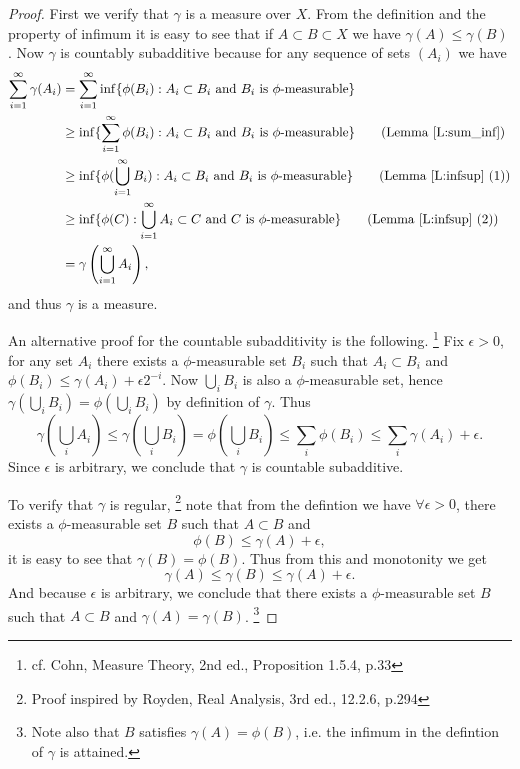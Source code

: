 \begin{proof}
First we verify that $\gamma$ is a measure over $X$. From the definition and the 
property of infimum it is easy to see that if $A\subset B\subset X$ we have
$\gamma(A)\le\gamma(B)$. Now $\gamma$ is countably subadditive because
for any sequence of sets $(A_i)$ we have
\begin{align*}
  \sum_{i=1}^{\infty} \gamma(A_i)
    &= \sum_{i=1}^{\infty} 
      \inf\{\phi(B_i): \text{$A_i\subset B_i$ and $B_i$ is $\phi$-measurable} \}
      \notag \\
    &\ge \inf \{ 
         \sum_{i=1}^{\infty} 
         \phi(B_i): \text{$A_i\subset B_i$ and $B_i$ is $\phi$-measurable} \}
       \qquad \text{(Lemma \ref{L:sum_inf})}    \notag \\
    &\ge \inf \{ 
         \phi(\bigcup_{i=1}^{\infty} B_i): 
             \text{$A_i\subset B_i$ and $B_i$ is $\phi$-measurable} \}
       \qquad \text{(Lemma \ref{L:infsup} (1))}    \notag \\
    &\ge 
      \inf \{ \phi(C):
      \text{$\bigcup_{i=1}^{\infty} A_i\subset C$ and $C$ is $\phi$-measurable} 
      \}       \qquad \text{(Lemma \ref{L:infsup} (2))}    \notag \\
    &= \gamma\left( \bigcup_{i=1}^{\infty} A_i \right),  \notag
\end{align*}
and thus $\gamma$ is a measure.

An alternative proof for the countable subadditivity is the following.
\footnote{cf. Cohn, Measure Theory, 2nd ed., Proposition 1.5.4, p.33}
Fix $\epsilon>0$, for any set $A_i$ there exists a $\phi$-measurable set $B_i$ 
such that $A_i\subset B_i$ and $\phi(B_i)\le \gamma(A_i)+\epsilon 2^{-i}$. 
Now $\bigcup_i B_i$ is also a $\phi$-measurable set, hence 
$\gamma(\bigcup_i B_i)=\phi(\bigcup_i B_i)$ by definition of $\gamma$. Thus
\[
  \gamma(\bigcup_i A_i) \le \gamma(\bigcup_i B_i) 
    = \phi(\bigcup_i B_i) \le \sum_i \phi(B_i) 
    \le \sum_i \gamma(A_i) + \epsilon.
\]
Since $\epsilon$ is arbitrary, we conclude that $\gamma$ is countable
subadditive. 

To verify that $\gamma$ is regular, 
\footnote{Proof inspired by Royden, Real Analysis, 3rd ed., 12.2.6, p.294}
note that from the defintion we have 
$\forall\epsilon>0$, there exists a $\phi$-measurable set $B$ such that
$A\subset B$ and 
\[
  \phi(B)\le \gamma(A)+\epsilon,
\]
it is easy to see that $\gamma(B)=\phi(B)$. Thus from this and monotonity we get
\[
  \gamma(A)\le \gamma(B) \le \gamma(A)+\epsilon.
\]
And because $\epsilon$ is arbitrary, we conclude that there exists a
$\phi$-measurable set $B$ such that $A\subset B$ and $\gamma(A)=\gamma(B)$.
\footnote{Note also that $B$ satisfies $\gamma(A)=\phi(B)$, i.e. the infimum
in the defintion of $\gamma$ is attained.}


\end{proof}
